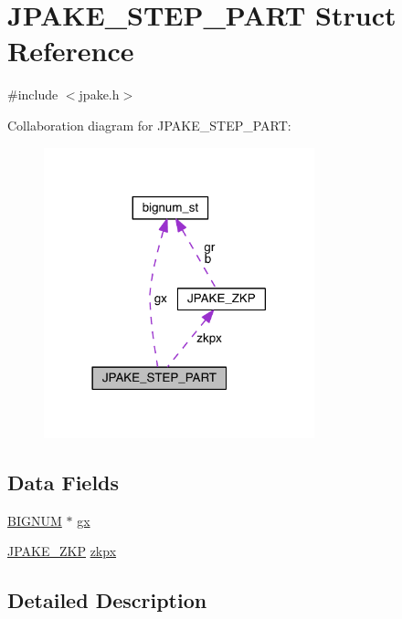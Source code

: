 \hypertarget{struct_j_p_a_k_e___s_t_e_p___p_a_r_t}{}\section{J\+P\+A\+K\+E\+\_\+\+S\+T\+E\+P\+\_\+\+P\+A\+RT Struct Reference}
\label{struct_j_p_a_k_e___s_t_e_p___p_a_r_t}


{\ttfamily \#include $<$jpake.\+h$>$}



Collaboration diagram for J\+P\+A\+K\+E\+\_\+\+S\+T\+E\+P\+\_\+\+P\+A\+RT\+:\nopagebreak
\begin{figure}[H]
\begin{center}
\leavevmode
\includegraphics[width=222pt]{struct_j_p_a_k_e___s_t_e_p___p_a_r_t__coll__graph}
\end{center}
\end{figure}
\subsection*{Data Fields}
\begin{DoxyCompactItemize}
\item 
\hyperlink{crypto_2ossl__typ_8h_a6fb19728907ec6515e4bfb716bffa141}{B\+I\+G\+N\+UM} $\ast$ \hyperlink{struct_j_p_a_k_e___s_t_e_p___p_a_r_t_a114e8fbd83fcf567581e9226feb9a43a}{gx}
\item 
\hyperlink{struct_j_p_a_k_e___z_k_p}{J\+P\+A\+K\+E\+\_\+\+Z\+KP} \hyperlink{struct_j_p_a_k_e___s_t_e_p___p_a_r_t_a91dc0671a490796b78cc7883f8ed9e2b}{zkpx}
\end{DoxyCompactItemize}


\subsection{Detailed Description}


